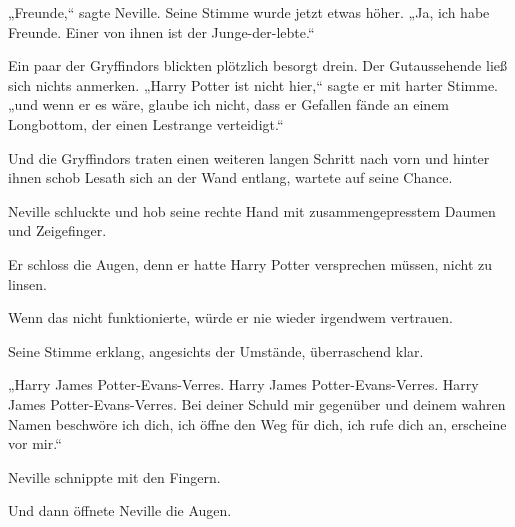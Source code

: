 „Freunde,“ sagte Neville. Seine Stimme wurde jetzt etwas höher. „Ja, ich habe Freunde. Einer von ihnen ist der Junge-der-lebte.“

Ein paar der Gryffindors blickten plötzlich besorgt drein. Der Gutaussehende ließ sich nichts anmerken. „Harry Potter ist nicht hier,“ sagte er mit harter Stimme. „und wenn er es wäre, glaube ich nicht, dass er Gefallen fände an einem Longbottom, der einen Lestrange verteidigt.“

Und die Gryffindors traten einen weiteren langen Schritt nach vorn und hinter ihnen schob Lesath sich an der Wand entlang, wartete auf seine Chance.

Neville schluckte und hob seine rechte Hand mit zusammengepresstem Daumen und Zeigefinger.

Er schloss die Augen, denn er hatte Harry Potter versprechen müssen, nicht zu linsen.

Wenn das nicht funktionierte, würde er nie wieder irgendwem vertrauen.

Seine Stimme erklang, angesichts der Umstände, überraschend klar.

„Harry James Potter-Evans-Verres. Harry James Potter-Evans-Verres. Harry James Potter-Evans-Verres. Bei deiner Schuld mir gegenüber und deinem wahren Namen beschwöre ich dich, ich öffne den Weg für dich, ich rufe dich an, erscheine vor mir.“

Neville schnippte mit den Fingern.

Und dann öffnete Neville die Augen.

